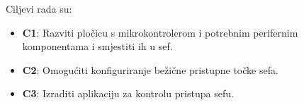 Ciljevi rada su:

\begin{itemize}
    \item \textbf{C1}: Razviti pločicu s mikrokontrolerom i potrebnim perifernim komponentama i smjestiti ih u sef.
    \item \textbf{C2}: Omogućiti konfiguriranje bežične pristupne točke sefa.
    \item \textbf{C3}: Izraditi aplikaciju za kontrolu pristupa sefu.
\end{itemize}
